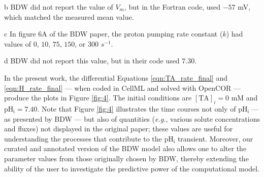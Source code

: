\documentclass[fleqn,10pt]{physiome}
\begin{document}
\begin{table}
\begin{threeparttable}
\begin{tablenotes}
    \item[b] BDW did not report the value of $V_m$, but in the Fortran code, used $-57$ mV, which matched the measured mean value.
    \item[c] In figure $6$A of the BDW paper, the proton pumping rate constant ($k$) had values of $0$, $10$, $75$, $150$, or $300$ $s^{-1}$.
    \item[d] BDW did not report this value, but in their code used $7.30$.
\end{tablenotes}
\end{threeparttable}
\label{table2}
\end{table}

In the present work, the differential Equations \ref{eqn:TA_rate_final} and \ref{eqn:H_rate_final} --- when coded in CellML and solved with OpenCOR --- produce the plots in Figure \ref{fig:4}. The initial conditions are $[\mathrm{TA}]_i=0$ mM and $\mathrm{pH_i}=7.40$. Note that Figure \ref{fig:4} illustrates the time courses not only of $\mathrm{pH_i}$ --- as presented by BDW --- but also of quantities (\emph{e.g.}, various solute concentrations and fluxes) not displayed in the original paper; these values are useful for understanding the processes that contribute to the $\mathrm{pH_i}$ transient. Moreover, our curated and annotated version of the BDW model also allows one to alter the parameter values from those originally chosen by BDW, thereby extending the ability of the user to investigate the predictive power of the computational model.
\end{document}
